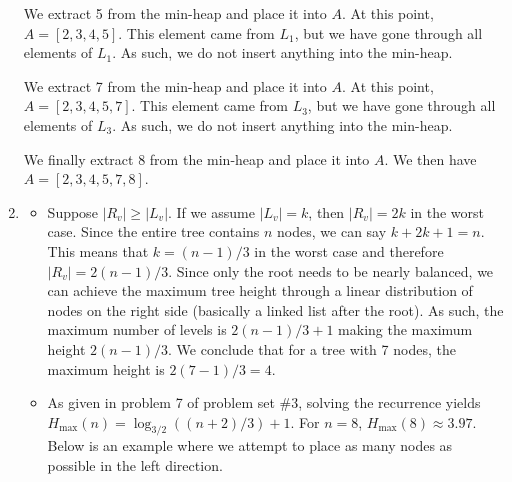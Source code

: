\documentclass[11pt, letterpaper, titlepage]{article}
\begin{document}
\begin{enumerate}[label=\alph*)]
    We extract 5 from the min-heap and place it into $A$. At this point, $A = [2, 3, 4, 5]$. This element came from $L_1$, but we have gone through all elements of $L_1$. As such, we do not insert anything into the min-heap.

    \begin{figure}[H]
    \centering
    \end{figure}

    We extract 7 from the min-heap and place it into $A$. At this point, $A = [2, 3, 4, 5, 7]$. This element came from $L_3$, but we have gone through all elements of $L_3$. As such, we do not insert anything into the min-heap.

    \begin{figure}[H]
    \centering
    \end{figure}

    We finally extract 8 from the min-heap and place it into $A$. We then have $A = [2, 3, 4, 5, 7, 8]$.

    \item \begin{itemize}
        \item Suppose $|R_v| \geq |L_v|$. If we assume $|L_v| = k$, then $|R_v| = 2k$ in the worst case. Since the entire tree contains $n$ nodes, we can say $k + 2k + 1 = n$. This means that $k = (n - 1) / 3$ in the worst case and therefore $|R_v| = 2(n - 1) / 3$. Since only the root needs to be nearly balanced, we can achieve the maximum tree height through a linear distribution of nodes on the right side (basically a linked list after the root). As such, the maximum number of levels is $2(n - 1)/3 + 1$ making the maximum height $2(n - 1)/3$. We conclude that for a tree with 7 nodes, the maximum height is $2(7 - 1)/3 = 4$.
        
        \item As given in problem 7 of problem set \#3, solving the recurrence yields $H_\text{max}(n) = \log_{3/2}((n + 2)/3) + 1$. For $n = 8$, $H_\text{max}(8) \approx 3.97$. Below is an example where we attempt to place as many nodes as possible in the left direction.
        

\end{itemize}
\end{enumerate}
\end{document}
